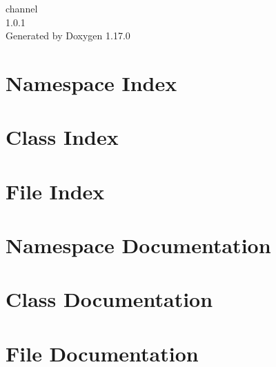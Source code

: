 \documentclass[twoside]{book}
\newcommand{\+}{\discretionary{\mbox{\scriptsize$\hookleftarrow$}}{}{}}
\newcommand{\clearemptydoublepage}{%
    \newpage{\pagestyle{empty}\cleardoublepage}%
  }
\begin{document}
  \raggedbottom
    \hypersetup{pageanchor=false,
                bookmarksnumbered=true,
                pdfencoding=unicode
               }
  \begin{titlepage}
  \vspace*{7cm}
  \begin{center}%
  {\Large channel}\\
  [1ex]\large 1.\+0.\+1 \\
  \vspace*{1cm}
  {\large Generated by Doxygen 1.17.0}\\
  \end{center}
  \end{titlepage}
  \clearemptydoublepage
  \tableofcontents
  \clearemptydoublepage
  \hypersetup{pageanchor=true}

\chapter{Namespace Index}

\chapter{Class Index}

\chapter{File Index}

\chapter{Namespace Documentation}


\chapter{Class Documentation}






\chapter{File Documentation}

  \backmatter
  \newpage
  \clearemptydoublepage
  \printindex
\end{document}
